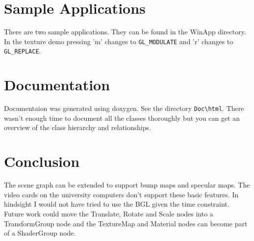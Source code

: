 \documentclass{article}
\begin{document}
\section{Sample Applications}
There are two sample applications. They can be found in the WinApp directory. In
the texture demo pressing 'm' changes to \verb|GL_MODULATE| and 'r' changes to
\verb|GL_REPLACE|.
\section{Documentation}
Documentaion was generated using doxygen. See the directory \verb|Doc\html|.
There wasn't enough time to document all the classes thoroughly but you can get
an overview of the class hierarchy and relationships.
\section{Conclusion}
The scene graph can be extended to support bump maps and specular maps. The
video cards on the university computers don't support these basic features.
In hindsight I would not have tried to use the BGL given the time constraint.
Future work could move the Translate, Rotate and Scale nodes into a
TransformGroup node and the TextureMap and Material nodes can become part of a
ShaderGroup node.  
\end{document}
